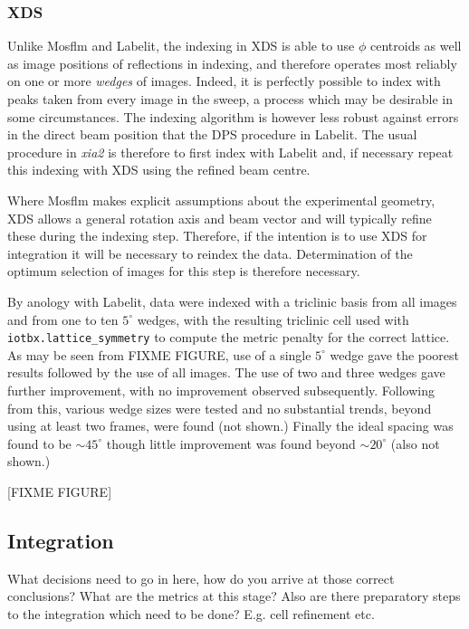 \documentclass[a4paper,11pt]{article}
\begin{document}
\subsubsection{XDS}

Unlike Mosflm and Labelit, the indexing in XDS is able to use $\phi$
centroids as well as image positions of reflections in indexing, and
therefore operates most reliably on one or more \emph{wedges} of
images. Indeed, it is perfectly possible to index with peaks taken
from every image in the sweep, a process which may be desirable in some
circumstances. The indexing algorithm is however less robust against
errors in the direct beam position that the DPS procedure in
Labelit. The usual procedure in \emph{xia2} is therefore to first
index with Labelit and, if necessary repeat this indexing with XDS
using the refined beam centre. 

Where Mosflm makes explicit assumptions about the experimental
geometry, XDS allows a general rotation axis and beam vector and will
typically refine these during the indexing step. Therefore, if the
intention is to use XDS for integration it will be necessary to
reindex the data. Determination of the optimum selection of images for
this step is therefore necessary.

By anology with Labelit, data were indexed with a triclinic basis
from all images and from one to ten $5^{\circ}$ wedges, with the
resulting triclinic cell used with \verb|iotbx.lattice_symmetry| to
compute the metric penalty for the correct lattice. As may be seen
from FIXME FIGURE, use of a single $5^{\circ}$ wedge gave the poorest
results followed by the use of all images. The use of two and three
wedges gave further improvement, with no improvement observed
subsequently. Following from this, various wedge sizes were tested and
no substantial trends, beyond using at least two frames, were found
(not shown.) Finally the ideal spacing was found to be $\sim
45^{\circ}$ though little improvement was found beyond $\sim
20^{\circ}$ (also not shown.)  

[FIXME FIGURE]

\subsection{Integration}

What decisions need to go in here, how do you arrive at those correct
conclusions? What are the metrics at this stage? Also are there
preparatory steps to the integration which need to be done? E.g. cell
refinement etc.
\end{document}
